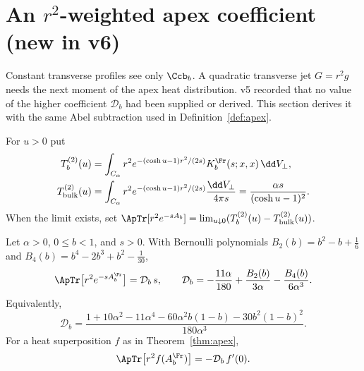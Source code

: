 \section{An \texorpdfstring{\(r^2\)}{r\textasciicircum 2}-weighted apex coefficient (new in v6)}
\label{sec:weighted}

Constant transverse profiles see only \(\Ccb_b\).
A quadratic transverse jet \(G=r^2g\) needs the next moment of the
apex heat distribution.
v5 recorded that no value of the higher coefficient \(\mathcal D_b\)
had been supplied or derived.
This section derives it with the same Abel subtraction used in
Definition~\ref{def:apex}.

\begin{definition}
\label{def:weighted}
For \(u>0\) put
\begin{align*}
T^{(2)}_b(u)
 &=\int_{C_\alpha}r^2
 e^{-(\cosh u-1)r^2/(2s)}K_b^\Fr(s;x,x)\,\dd V_\perp,\\
T^{(2)}_{\rm bulk}(u)
 &=\int_{C_\alpha}r^2
 e^{-(\cosh u-1)r^2/(2s)}\frac{\dd V_\perp}{4\pi s}
 =\frac{\alpha s}{(\cosh u-1)^2}.
\end{align*}
When the limit exists, set
\(\ApTr[r^2e^{-sA_b}]=\lim_{u\downarrow0}
(T^{(2)}_b(u)-T^{(2)}_{\rm bulk}(u))\).
\end{definition}

\begin{theorem}
\label{thm:weighted}
Let \(\alpha>0\), \(0\le b<1\), and \(s>0\).
With Bernoulli polynomials \(B_2(b)=b^2-b+\tfrac16\) and
\(B_4(b)=b^4-2b^3+b^2-\tfrac1{30}\),
\begin{equation}
\ApTr\bigl[r^2e^{-sA_b^\Fr}\bigr]=\mathcal D_b\,s,
\qquad
\mathcal D_b=-\frac{11\alpha}{180}
+\frac{B_2(b)}{3\alpha}-\frac{B_4(b)}{6\alpha^3}.
\label{eq:Db}
\end{equation}
Equivalently,
\begin{equation}
\mathcal D_b=
\frac{1+10\alpha^2-11\alpha^4-60\alpha^2b(1-b)-30b^2(1-b)^2}
{180\alpha^3}.
\label{eq:Dbexpanded}
\end{equation}
For a heat superposition \(f\) as in Theorem~\ref{thm:apex},
\begin{equation}
\ApTr\bigl[r^2f(A_b^\Fr)\bigr]=-\mathcal D_b\,f'(0).
\label{eq:Dfunctional}
\end{equation}
\end{theorem}

